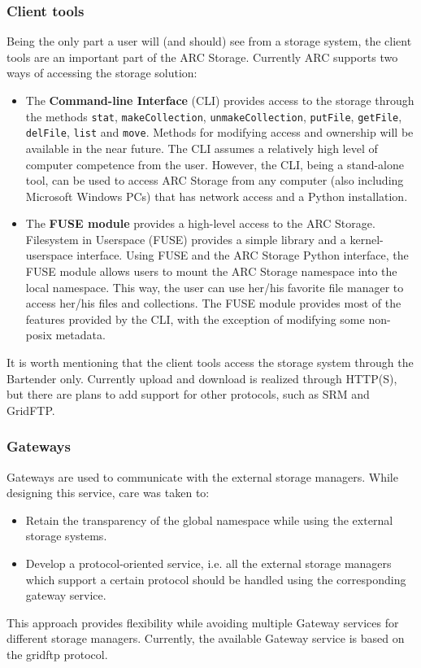 \documentclass[final]{ieee}
\begin{document}
\subsubsection{Client tools }
\label{Client extension using FUSE module}

Being the only part a user will (and should) see from a storage
system, the client tools are an important part of the ARC
Storage. Currently ARC supports two ways of accessing the
storage solution:
\begin{itemize}
\item The \textbf{Command-line Interface} (CLI) provides
  access to the storage through the methods \texttt{stat}, \texttt{makeCollection},
  \texttt{unmakeCollection}, \texttt{putFile}, \texttt{getFile}, \texttt{delFile},
  \texttt{list} and \texttt{move}. Methods for modifying
  access and ownership will be available in the near future. The CLI
  assumes a relatively high level of computer competence
  from the user. However, the CLI, being a stand-alone tool, can be
  used to access ARC Storage from any computer (also including
  Microsoft Windows PCs) that has network access and
  a Python installation.
\item The \textbf{FUSE module} provides a high-level access to the
  ARC Storage. Filesystem in Userspace (FUSE) \cite{FUSE} provides a simple
  library and a kernel-userspace interface. Using FUSE and the ARC
  Storage Python interface, the FUSE module allows users to mount the
  ARC Storage namespace into the local namespace. This way, the user
  can use her/his favorite file manager to access her/his files and
  collections. The FUSE module provides most of the features provided
  by the CLI, with the exception of modifying some non-posix metadata.
\end{itemize}
It is worth mentioning that the client tools access the storage system
through the Bartender only. Currently upload and download is realized
through HTTP(S), but there are plans to add support for other
protocols, such as SRM and GridFTP.

\subsubsection{Gateways }
\label{Gateways}

Gateways are used to communicate with the external storage
managers. While designing this service, care was taken to: 
\begin{itemize}
\item Retain the transparency of the global namespace while using the external storage systems.
\item  Develop a protocol-oriented  service, i.e. all the external
  storage managers which support a certain protocol should be handled
  using the corresponding gateway service.  
\end{itemize}
This approach provides flexibility while avoiding multiple Gateway
services for different storage managers. Currently, the available
Gateway service is based on the gridftp protocol.  
\end{document}
